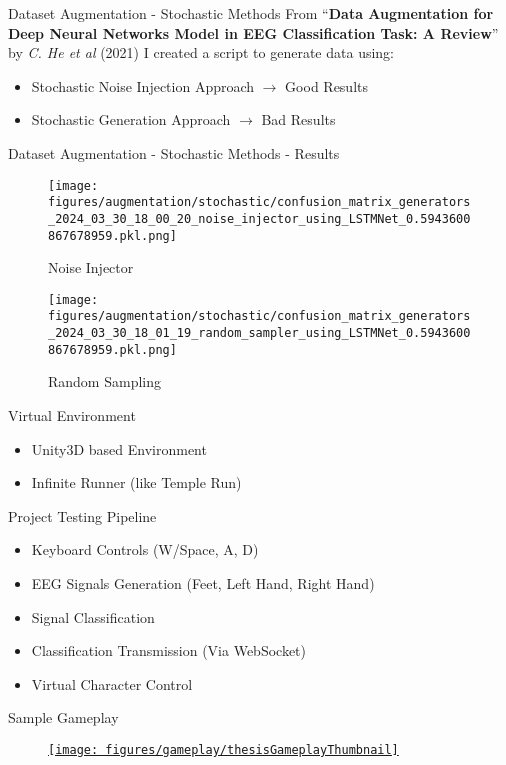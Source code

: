 \begin{frame}{Dataset Augmentation - Stochastic Methods}
    From ``\textbf{Data Augmentation for Deep Neural Networks Model in EEG Classification Task: A Review}'' by \textit{C. He et al} (2021) I created a script to generate data using:
    \begin{itemize}
        \item Stochastic Noise Injection Approach $\rightarrow{}$ Good Results
        \item Stochastic Generation Approach $\rightarrow{}$ Bad Results
    \end{itemize}
\end{frame}
\begin{frame}{Dataset Augmentation - Stochastic Methods - Results}
    \begin{minipage}{0.49\textwidth}
        \begin{figure}[htpb!]
            \centering
            \texttt{[image: figures/augmentation/stochastic/confusion\_matrix\_generators\_2024\_03\_30\_18\_00\_20\_noise\_injector\_using\_LSTMNet\_0.5943600867678959.pkl.png]}
            \caption{Noise Injector}
        \end{figure}
    \end{minipage}
    \begin{minipage}{0.49\textwidth}
        \begin{figure}[htpb!]
            \centering
            \texttt{[image: figures/augmentation/stochastic/confusion\_matrix\_generators\_2024\_03\_30\_18\_01\_19\_random\_sampler\_using\_LSTMNet\_0.5943600867678959.pkl.png]}
            \caption{Random Sampling}
        \end{figure}
    \end{minipage}
\end{frame}

\begin{frame}{Virtual Environment}
\begin{itemize}
    \item Unity3D based Environment
    \item Infinite Runner (like Temple Run)
\end{itemize}
\end{frame}

\begin{frame}{Project Testing Pipeline}
    \begin{itemize}
        \item Keyboard Controls (W/Space, A, D)
        \item EEG Signals Generation (Feet, Left Hand, Right Hand)
        \item Signal Classification
        \item Classification Transmission (Via WebSocket)
        \item Virtual Character Control
    \end{itemize}
\end{frame}

\begin{frame}{Sample Gameplay}
    \begin{figure}[htpb!]
        \centering
        \href{https://youtu.be/3T2kwwnvs3c}{%
        \texttt{[image: figures/gameplay/thesisGameplayThumbnail]}%
        }
    \end{figure}
\end{frame}